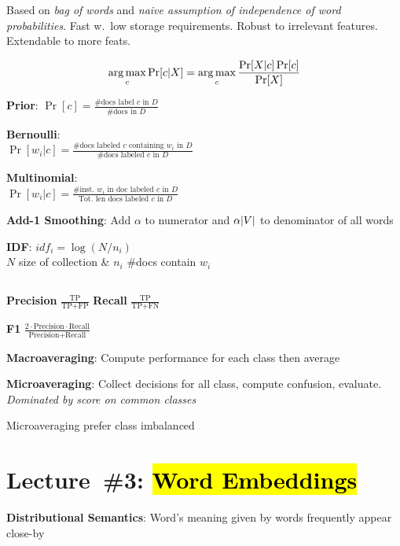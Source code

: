 \documentclass[9pt]{extarticle}
\renewcommand{\green}[1]{{\color{ForestGreen} #1}}
\newcommand{\greenbf}[1]{\textbf{\green{#1}}}
\begin{document}
\begin{multicols}{3}
  Based on \textit{bag of words} and \textit{naive assumption of independence of word probabilities}. Fast w.\ low storage requirements. Robust to irrelevant features. Extendable to more feats.

  \begin{equation*}\label{eq:L02:NaiveBayes}
    \operatorname*{arg\,max}_c \Pr\lbrack c \vert X\rbrack = \operatorname*{arg\,max}_{c} \frac{\Pr[X \vert c] \Pr[c]}{\Pr[X]}
  \end{equation*}

  \greenbf{Prior}: $\Pr[c] = \frac{\text{\#docs label } c \text{ in } D}{\text{\#docs in } D}$

  \greenbf{Bernoulli}: \\ $\Pr[w_ i \vert c] = \frac{\text{\# docs labeled } c \text{ containing } w_i \text{ in } D}{\text{\#docs labeled } c \text{ in } D}$

  \greenbf{Multinomial}: \\ $\Pr[w_i \vert c] = \frac{\text{\# inst.\ } w_i \text{ in doc labeled } c \text{ in } D}{\text{Tot.\ len docs labeled } c \text{ in } D}$

  \greenbf{Add-1 Smoothing}: Add $\alpha$ to numerator and $\alpha\lvert V\rvert$ to denominator of all words

  \greenbf{IDF}: $idf_i = \log \left(N/n_i\right)$ \\ $N$ size of collection \& $n_i$ \#docs contain $w_i$

  \subsection*{}

  \greenbf{Precision} $\frac{\text{TP}}{\text{TP} + \text{FP}}$ \hspace{0.1cm} \greenbf{Recall} $\frac{\text{TP}}{\text{TP} + \text{FN}}$

  \greenbf{F1} $\frac{2 \cdot \text{Precision} \cdot \text{Recall}}{\text{Precision} + \text{Recall}}$

  \greenbf{Macroaveraging}: Compute performance for each class then average

  \greenbf{Microaveraging}: Collect decisions for all class, compute confusion, evaluate. \textit{Dominated by score on common classes}

  Microaveraging prefer class imbalanced

  \section*{Lecture~\#3: \hl{Word Embeddings}}
  \greenbf{Distributional Semantics}: Word's meaning given by words frequently appear close-by


\end{multicols}
\end{document}
